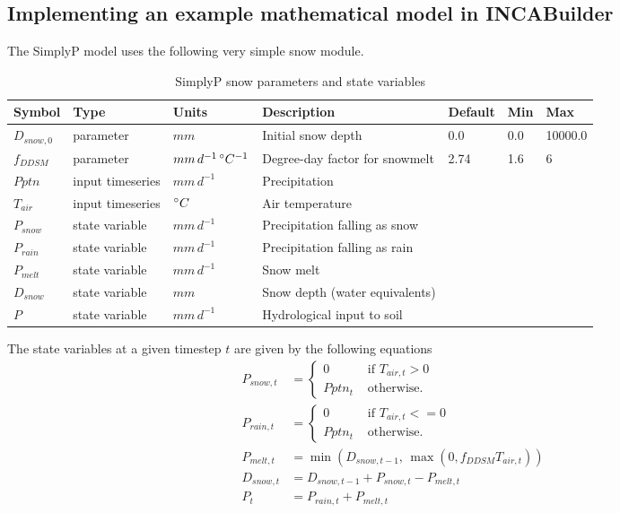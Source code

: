 \documentclass[11pt]{article}
\theoremstyle{definition}
\begin{document}
\subsection{Implementing an example mathematical model in INCABuilder}

The SimplyP model \cite{jackson-blake17} uses the following very simple snow module.

\begin{table}[H]
\centering
\label{tab:simplypsnow}
\begin{tabular}{|lllllll|}
\hline
Symbol & Type & Units & Description & Default & Min & Max \\
\hline
$D_{snow,0}$ & parameter & $mm$                                    & Initial snow depth & 0.0 & 0.0 & 10000.0\\
$f_{DDSM}$    & parameter & $mm\, d^{-1}\, \degree C^{-1}$ & Degree-day factor for snowmelt & 2.74 &1.6 & 6\\
\hline
$Pptn$            & input timeseries &  $mm\, d^{-1}$                     & Precipitation & & & \\
$T_{air}$        & input timeseries & $\degree C$                           & Air temperature & & & \\
\hline
$P_{snow}$   & state variable &  $mm\, d^{-1}$               & Precipitation falling as snow & & & \\
$P_{rain}$     & state variable &   $mm\, d^{-1}$              & Precipitation falling as rain & & & \\
$P_{melt}$   & state variable &  $mm\, d^{-1}$                & Snow melt & & & \\
$D_{snow}$   & state variable & $mm$                                & Snow depth (water equivalents) & & & \\
$P$               & state variable &  $mm\, d^{-1}$                & Hydrological input to soil & & &\\
\hline
\end{tabular}
\caption{SimplyP snow parameters and state variables}
\end{table}
The state variables at a given timestep $t$ are given by the following equations
\begin{align*}
P_{snow,t} &= \begin{cases}
0 & \mbox{ if }T_{air,t} > 0\\
Pptn_t & \mbox{ otherwise.}
\end{cases}\\
P_{rain,t} &= \begin{cases}
0 & \mbox{ if }T_{air,t} <= 0\\
Pptn_t & \mbox{ otherwise.}
\end{cases}\\
P_{melt,t} &= \min(D_{snow,t-1},  \,\max(0, f_{DDSM}T_{air,t}))\\
D_{snow,t} &= D_{snow,t-1}+P_{snow,t}-P_{melt,t}\\
P_t &= P_{rain,t} + P_{melt,t}
\end{align*}
\end{document}
